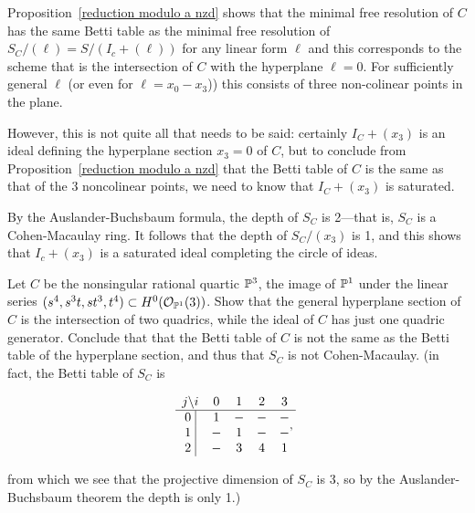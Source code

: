 \begin{example}
Proposition~\ref{reduction modulo a nzd} shows that the minimal free resolution of $C$ has the same Betti table as the minimal free resolution of $S_{C}/(\ell) = S/(I_{c}+(\ell))$ for any linear form $\ell$ and this corresponds to the 
scheme that is the intersection of $C$ with the hyperplane $\ell = 0$. For sufficiently general $\ell$ (or even
for $\ell = x_{0}-x_{3}$)) this consists of three non-colinear points in the plane.

However, this is not quite all that needs to be said: certainly $I_{C}+(x_{3})$ is an ideal defining the hyperplane section $x_{3}= 0$ of $C$, but to conclude from  Proposition~\ref{reduction modulo a nzd} that the Betti table of $C$ is the same as that of the 3 noncolinear points, we need to know that $I_{C}+(x_{3})$ is saturated.

By the Auslander-Buchsbaum formula, the depth of $S_{C}$ is 2---that is, $S_{C}$ is a Cohen-Macaulay ring. It follows that the depth of $S_{C}/(x_{3})$ is 1, and this shows that $I_{c}+(x_{3})$ is a saturated ideal completing the circle of ideas.
\end{example}

\begin{exercise}
 Let $C$ be the nonsingular rational quartic ${\mathbb P}^{3}$, the image of ${\mathbb P}^{1}$ under the linear series
 $(s^{4}, s^{3}t, st^{3}, t^{4})\subset H^{0}({\mathcal O}_{{\mathbb P}^{1}}(3))$. Show that the general hyperplane section of $C$  is the intersection of two quadrics, while the ideal of $C$ has just one quadric generator. Conclude that
  that the Betti table of $C$ is not the same as the Betti table of the hyperplane section, and thus that
  $S_{C}$ is not Cohen-Macaulay. (in fact, the Betti table of $S_{C}$ is
\begin{small}
$$
\begin{matrix}
j \backslash i &0&1&2&3\\ \hline
\text{0 }\vline &1&-&-&-\\
\text{1 }\vline &-&1&-&-\\
\text{2 }\vline &-&3&4&1\\
\end{matrix},
$$
\end{small}

\noindent from which we see that the projective dimension of $S_{C}$ is 3, so by the Auslander-Buchsbaum theorem the depth is only 1.)
\end{exercise}

